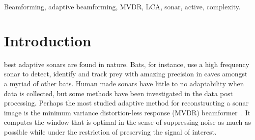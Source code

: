 \documentclass[10pt,journal,draftclsnofoot,onecolumn]{IEEEtran}
\newcommand\1{\vec 1}
\begin{document}
{\begin{abstract}
% 


\end{abstract}

\ifPeerReview\else
\begin{IEEEkeywords}\color{gray}
Beamforming, adaptive beamforming, MVDR, LCA, sonar, active, complexity.
\end{IEEEkeywords}
\fi}

\maketitle

\IEEEdisplaynotcompsoctitleabstractindextext


\IEEEpeerreviewmaketitle

\section{Introduction}


 best adaptive sonars are found in nature. Bats, for instance, use a high frequency sonar to detect, identify and track prey with amazing precision in caves amongst a myriad of other bats. Human made sonars have little to no adaptability when data is collected, but some methods have been investigated in the data post processing. Perhaps the most studied adaptive method for reconstructing a sonar image is the minimum variance distortion-less response (MVDR) beamformer~\cite{Capon1969}. It computes the window that is optimal in the sense of suppressing noise as much as possible while under the restriction of  preserving the signal of interest.
\end{document}
